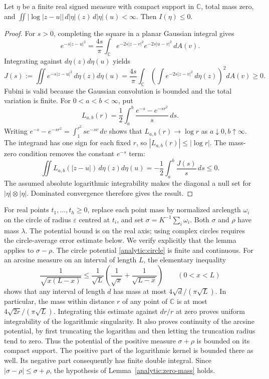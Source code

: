 \begin{lemma}\label{analytic:zero-mass}
Let \(\eta\) be a finite real signed measure with compact support in
\(\mathbb C\), total mass zero, and
\(\iint|\log|z-u||\,d|\eta|(z)\,d|\eta|(u)<\infty\).
Then \(I(\eta)\leq0\).
\end{lemma}
\begin{proof}
For \(s>0\), completing the square in a planar Gaussian integral gives
\[
 e^{-s|z-u|^2}=\frac{4s}{\pi}
 \int_{\mathbb C}e^{-2s|z-v|^2}e^{-2s|u-v|^2}\,dA(v).
\]
Integrating against \(d\eta(z)d\eta(u)\) yields
\[
 J(s):=\iint e^{-s|z-u|^2}\,d\eta(z)d\eta(u)
 =\frac{4s}{\pi}\int_{\mathbb C}
       \left(\int e^{-2s|z-v|^2}\,d\eta(z)\right)^2dA(v)\geq0.
\]
Fubini is valid because the Gaussian convolution is bounded and the
total variation is finite.
For \(0<a<b<\infty\), put
\[
 L_{a,b}(r)=\frac12\int_a^b\frac{e^{-s}-e^{-sr^2}}s\,ds.
\]
Writing \(e^{-s}-e^{-sr^2}=\int_1^{r^2}s e^{-sv}\,dv\)
shows that \(L_{a,b}(r)\to\log r\) as \(a\downarrow0,b\uparrow\infty\).
The integrand has one sign for each fixed \(r\), so
\(|L_{a,b}(r)|\leq|\log r|\).
The mass-zero condition removes the constant \(e^{-s}\) term:
\[
 \iint L_{a,b}(|z-u|)\,d\eta(z)d\eta(u)
       =-\frac12\int_a^b\frac{J(s)}s\,ds\leq0.
\]
The assumed absolute logarithmic integrability makes the diagonal a
null set for \(|\eta|\otimes|\eta|\). Dominated convergence therefore
gives the result.
\end{proof}

For real points \(t_1,\ldots,t_h\geq0\), replace each point mass by
normalized arclength \(\omega_i\) on the circle of radius
\(\varepsilon\) centred at \(t_i\), and set
\(\sigma=K^{-1}\sum_i\omega_i\).
Both \(\sigma\) and \(\rho\) have mass \(\lambda\).
The potential bound is on the real axis; using complex circles requires
the circle-average error estimate below.
We verify explicitly that the lemma applies to \(\sigma-\rho\).
The circle potential \eqref{analytic:circle} is finite and continuous.
For an arcsine measure on an interval of length \(L\), the elementary
inequality
\[
 \frac1{\sqrt{x(L-x)}}\leq
 \frac1{\sqrt L}\left(\frac1{\sqrt x}+\frac1{\sqrt{L-x}}\right)
 \qquad(0<x<L)
\]
shows that any interval of length \(d\) has mass at most
\(4\sqrt d/(\pi\sqrt L)\). In particular, the mass within distance \(r\)
of any point of \(\mathbb C\) is at most
\(4\sqrt{2r}/(\pi\sqrt L)\).
Integrating this estimate against \(dr/r\) at zero proves uniform
integrability of the logarithmic singularity. It also proves continuity
of the arcsine potential, by first truncating the logarithm and then
letting the truncation radius tend to zero.
Thus the potential of the positive measure \(\sigma+\rho\) is bounded
on its compact support. The positive part of the logarithmic kernel
is bounded there as well. Its negative part consequently has finite
double integral. Since
\(|\sigma-\rho|\leq\sigma+\rho\), the hypothesis of
Lemma~\ref{analytic:zero-mass} holds.


